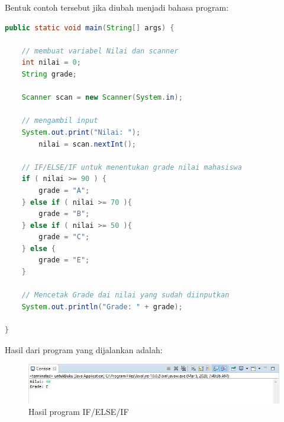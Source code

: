 \noindent{}

\medskip

Bentuk contoh tersebut jika diubah menjadi bahasa program:
\begin{lstlisting}[language=Java]
public static void main(String[] args) {

    // membuat variabel Nilai dan scanner
    int nilai = 0;
    String grade;
        
    Scanner scan = new Scanner(System.in);

    // mengambil input
    System.out.print("Nilai: ");
        nilai = scan.nextInt();

    // IF/ELSE/IF untuk menentukan grade nilai mahasiswa 
    if ( nilai >= 90 ) {
        grade = "A";
    } else if ( nilai >= 70 ){
        grade = "B";
    } else if ( nilai >= 50 ){
        grade = "C";
    } else {
        grade = "E";
    }

    // Mencetak Grade dai nilai yang sudah diinputkan 
    System.out.println("Grade: " + grade);

}
\end{lstlisting}

Hasil dari program yang dijalankan adalah:
\begin{figure}[h!]
    \centering
    \includegraphics[scale=0.6]{pictures/hasil_if_else_if.JPG}
    \caption{Hasil program IF/ELSE/IF}
    \label{}
\end{figure}

\newpage
